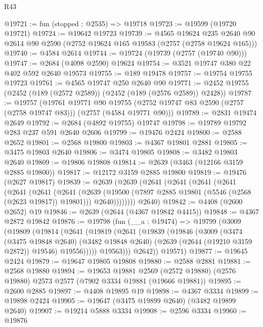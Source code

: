 \begin{lexlean}{R43}
\begin{coremodule}
@19721 := fun (stopped : @2535) => @19718
@19723 := @19599 (@19720 @19721)
@19724 := @19642 @19723
@19739 := @4565
    @19624
    @235
    @2640
    @90
    @2614
    @90
    @2590
    (@2752 @19624 @165 @19583 (@2757 (@2758 @19624 @165)))
@19740 := @4584 @2614
@19744 := @19724 (@19739 (@2757 (@19740 @90)))
@19747 := @2684 (@4098 @2590) @19624
@19754 := @3521 @19747 @380 @22 @402 @592 @2640 @19573
@19755 := @189 @19478
@19757 := @19754 @19755 @19723
@19761 := @4565 @19747 @250 @2640 @90
@19771 := @2452 @19755 (@2452 (@189 (@2572 @2589)) (@2452 (@189 (@2576 @2589)) @2428))
@19787 := @19757
    (@19761
      @19771
      @90
      @19755
      (@2752 @19747 @83 @2590 (@2757 (@2758 @19747 @83)))
      (@2757 (@4584 @19771 @90)))
@19789 := @2831 @19474 @2649
@19792 := @2684 (@4892 @19755) @19747
@19798 := @19789 @19792 @283 @237 @591 @2640 @2606
@19799 := @19476 @2424
@19800 := @2588 @2652
@19801 := @2568 @19800
@19803 := @4367 @19801 @2881
@19805 := @3475 @19803 @2640
@19806 := @3474 @19805
@19808 := @3482 @19803 @2640
@19809 := @19806 @19808
@19814 := @2639 (@3463 (@12166 @3159 @2885 @19800))
@19817 := @12172 @3159 @2885 @19800
@19819 := @19476 (@2627 @19817)
@19839 := @2639
    (@2639
      (@2641
        (@2641
          (@2641
            (@2641
              (@2641
                (@2641
                  (@2641
                    (@2639
                      (@19500 (@7897 @2885 @19801 (@5546 (@2568 (@2623 @19817)) @19801)))
                      @2640))))))))
      @2640)
@19842 := @4408 (@2600 @2652) @19
@19846 := @2639 (@2644 (@4367 @19842 @4415))
@19848 := @4367 @2872 @19842
@19876 := @19798
    (fun (__a : @19474) =>
    @19799
      (@3009
        (@19809
          (@19814
            (@2641
              (@19819
                (@2641
                  (@19839
                    (@19846
                      (@3009
                        (@3474
                          (@3475 @19848 @2640)
                          (@3482 @19848 @2640)
                          (@2639 (@2644 (@19210 @3159 @2872)) @19546)
                          @19556)))))
                @19563)))
          @2642))
      @19571)
@19877 := @19645 @2424
@19879 := @19647 @19805 @19808
@19880 := @2588 @2881
@19881 := @2568 @19880
@19894 := @19653
    @19881
    @2569
    (@2572 @19880)
    (@2576 @19880)
    @2573
    @2577
    (@7902 @3334 @19881 (@19666 @19881))
@19895 := @2600 @2885
@19897 := @4408 @19895 @19
@19898 := @4367 @3334
@19899 := @19898 @2424
@19905 := @19647 (@3475 @19899 @2640) (@3482 @19899 @2640)
@19907 := @19214 @5888 @3334
@19908 := @2596 @3334
@19960 := @19876

\end{coremodule}
\end{lexlean}
